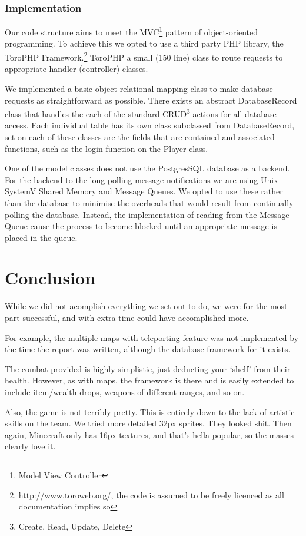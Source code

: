 \documentclass[12pt]{amsart}
\begin{document}
    \subsubsection{Implementation}
      \begin{flushleft}
        Our code structure aims to meet the MVC\footnote{Model View Controller} 
        pattern of object-oriented programming. To achieve this we opted to use a third 
        party PHP library, the ToroPHP Framework.\footnote{http://www.toroweb.org/, 
        the code is assumed to be freely licenced as all documentation implies so} 
        ToroPHP a small (150 line) class to route requests to appropriate handler 
        (controller) classes.

        We implemented a basic object-relational mapping class to make database 
        requests as straightforward as possible. There exists an abstract 
        DatabaseRecord class that handles the each of the standard 
        CRUD\footnote{Create, Read, Update, Delete} actions for all database 
        access. Each individual table has its own class subclassed from 
        DatabaseRecord, set on each of these classes are the fields that are 
        contained and associated functions, such as the login function on the 
        Player class.

        One of the model classes does not use the PostgresSQL database as a 
        backend. For the backend to the long-polling message notifications we
        are using Unix SystemV Shared Memory and Message Queues. We opted to use 
        these rather than the database to minimise the overheads that would 
        result from continually polling the database. Instead, the 
        implementation of reading from the Message Queue cause the process to
        become blocked until an appropriate message is placed in the queue.
      \end{flushleft}

\section{Conclusion}
  \begin{flushleft}
    While we did not acomplish everything we set out to do, we were for the
    most part successful, and with extra time could have accomplished more. 

    For example, the multiple maps with teleporting feature was not implemented
    by the time the report was written, although the database framework for it
    exists. 

    The combat provided is highly simplistic, just deducting your `shelf' from
    their health. However, as with maps, the framework is there and is easily
    extended to include item/wealth drops, weapons of different ranges, and so
    on.

    Also, the game is not terribly pretty. This is entirely down to the lack of
    artistic skills on the team. We tried more detailed 32px sprites. They
    looked shit. Then again, Minecraft only has 16px textures, and that's hella
    popular, so the masses clearly love it.
  \end{flushleft}
\end{document}
